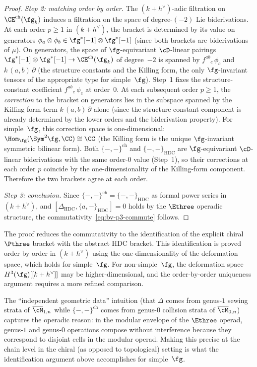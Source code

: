 \begin{proof}
\textit{Step 2: matching order by order.}
The $(k+h^\vee)$-adic filtration on
$\CE^{\mathrm{ch}}(\fg_k)$ induces a filtration on the
space of degree-$(-2)$ Lie biderivations. At each order
$p \geq 1$ in $(k+h^\vee)$, the bracket is determined by
its value on generators
$\phi_a \otimes \phi_b \in \fg^*[-1] \otimes \fg^*[-1]$
(since both brackets are biderivations of $\mu$). On
generators, the space of $\fg$-equivariant $\cD$-linear
pairings $\fg^*[-1] \otimes \fg^*[-1] \to
\CE^{\mathrm{ch}}(\fg_k)$ of degree~$-2$ is spanned by
$f^{ab}{}_c\,\phi_c$ and $k\,(a,b)\,\partial$ (the
structure constants and the Killing form, the only
$\fg$-invariant tensors of the appropriate type for
simple~$\fg$). Step~1 fixes the structure-constant coefficient
$f^{ab}{}_c\,\phi_c$ at order~$0$.  At each subsequent
order $p \geq 1$, the \emph{correction} to the bracket on
generators lies in the subspace spanned by the Killing-form
term $k\,(a,b)\,\partial$ alone (since the
structure-constant component is already determined by
the lower orders and the biderivation property).
For simple~$\fg$, this correction space is
one-dimensional: $\Hom_\fg(\Sym^2\fg, \CC) \cong \CC$
(the Killing form is the unique $\fg$-invariant symmetric
bilinear form).  Both $\{-,-\}^{\mathrm{ch}}$ and
$\{-,-\}_{\mathrm{HDC}}$ are $\fg$-equivariant
$\cD$-linear biderivations with the same
order-$0$ value (Step~1), so their corrections at each
order $p$ coincide by the one-dimensionality of the
Killing-form component.  Therefore the two brackets agree
at each order.

\textit{Step 3: conclusion.}
Since $\{-,-\}^{\mathrm{ch}} = \{-,-\}_{\mathrm{HDC}}$
as formal power series in $(k+h^\vee)$, and
$[\Delta_{\mathrm{HDC}}, \{a,-\}_{\mathrm{HDC}}] = 0$
holds by the $\Ethree$ operadic structure,
the commutativity~\eqref{eq:bv-p3-commute} follows.
\end{proof}

\begin{remark}
\label{rem:bv-p3-chain-level}
The proof reduces the commutativity to the identification
of the explicit chiral $\Pthree$ bracket with the abstract
HDC bracket. This identification is proved order by order
in $(k+h^\vee)$ using the one-dimensionality of the
deformation space, which holds for simple~$\fg$.
For non-simple~$\fg$, the deformation space
$H^3(\fg)[[k+h^\vee]]$ may be higher-dimensional, and the
order-by-order uniqueness argument requires a more refined
comparison.

The ``independent geometric data'' intuition (that
$\Delta$ comes from genus-$1$ sewing strata of
$\overline{\cM}_{1,n}$ while
$\{-,-\}^{\mathrm{ch}}$ comes from genus-$0$ collision
strata of $\overline{\cM}_{0,n}$) captures the operadic
reason: in the modular envelope of the $\Ethree$ operad,
genus-$1$ and genus-$0$ operations compose without
interference because they correspond to disjoint cells
in the modular operad. Making this precise at the
chain level in the chiral (as opposed to topological)
setting is what the identification argument above
accomplishes for simple~$\fg$.
\end{remark}

